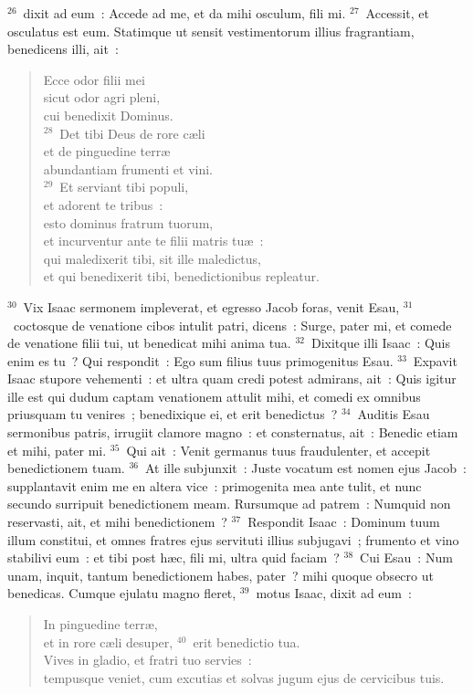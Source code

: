 ${}^{26}$~dixit ad eum~: Accede ad me, et da mihi osculum, fili mi.
${}^{27}$~Accessit, et osculatus est eum. Statimque ut sensit vestimentorum illius fragrantiam, benedicens illi, ait~: \begin{verse}Ecce odor filii mei\\ sicut odor agri pleni,\\ cui benedixit Dominus.\\
${}^{28}$~Det tibi Deus de rore c\ae li\\ et de pinguedine terr\ae \\ abundantiam frumenti et vini.\\
${}^{29}$~Et serviant tibi populi,\\ et adorent te tribus~:\\ esto dominus fratrum tuorum,\\ et incurventur ante te filii matris tu\ae~:\\ qui maledixerit tibi, sit ille maledictus,\\ et qui benedixerit tibi, benedictionibus repleatur.\end{verse}


${}^{30}$~Vix Isaac sermonem impleverat, et egresso Jacob foras, venit Esau,
${}^{31}$~coctosque de venatione cibos intulit patri, dicens~: Surge, pater mi, et comede de venatione filii tui, ut benedicat mihi anima tua.
${}^{32}$~Dixitque illi Isaac~: Quis enim es tu~? Qui respondit~: Ego sum filius tuus primogenitus Esau.
${}^{33}$~Expavit Isaac stupore vehementi~: et ultra quam credi potest admirans, ait~: Quis igitur ille est qui dudum captam venationem attulit mihi, et comedi ex omnibus priusquam tu venires~; benedixique ei, et erit benedictus~?
${}^{34}$~Auditis Esau sermonibus patris, irrugiit clamore magno~: et consternatus, ait~: Benedic etiam et mihi, pater mi.
${}^{35}$~Qui ait~: Venit germanus tuus fraudulenter, et accepit benedictionem tuam.
${}^{36}$~At ille subjunxit~: Juste vocatum est nomen ejus Jacob~: supplantavit enim me en altera vice~: primogenita mea ante tulit, et nunc secundo surripuit benedictionem meam. Rursumque ad patrem~: Numquid non reservasti, ait, et mihi benedictionem~?
${}^{37}$~Respondit Isaac~: Dominum tuum illum constitui, et omnes fratres ejus servituti illius subjugavi~; frumento et vino stabilivi eum~: et tibi post h\ae c, fili mi, ultra quid faciam~?
${}^{38}$~Cui Esau~: Num unam, inquit, tantum benedictionem habes, pater~? mihi quoque obsecro ut benedicas. Cumque ejulatu magno fleret,
${}^{39}$~motus Isaac, dixit ad eum~: \begin{verse}In pinguedine terr\ae ,\\ et in rore c\ae li desuper,
${}^{40}$~erit benedictio tua.\\ Vives in gladio, et fratri tuo servies~:\\ tempusque veniet, cum excutias et solvas jugum ejus de cervicibus tuis.\end{verse}


